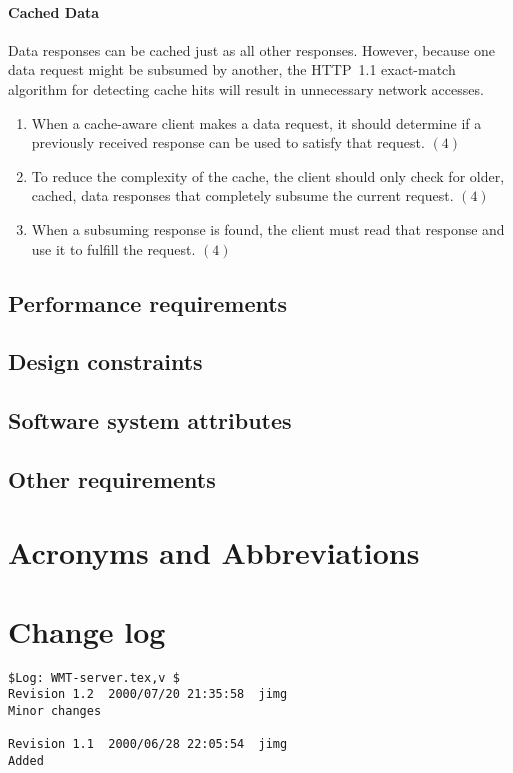 \documentclass{article}
\begin{document}
\paragraph{Cached Data}
Data responses can be cached just as all other responses. However, because
one data request might be subsumed by another, the HTTP~1.1 exact-match
algorithm for detecting cache hits will result in unnecessary network
accesses. 
\begin{enumerate}
\item When a cache-aware client makes a data request, it should determine if
  a previously received response can be used to satisfy that request. $(4)$
\item To reduce the complexity of the cache, the client should only check for
  older, cached, data responses that completely subsume the current request.
  $(4)$
\item When a subsuming response is found, the client must read that response
  and use it to fulfill the request. $(4)$
\end{enumerate}

\subsection{Performance requirements}
\subsection{Design constraints}
\subsection{Software system attributes}
\subsection{Other requirements}

\appendix

\section{Acronyms and Abbreviations}
\begin{acronym}

\end{acronym}

\section{Change log}

\begin{verbatim}
$Log: WMT-server.tex,v $
Revision 1.2  2000/07/20 21:35:58  jimg
Minor changes

Revision 1.1  2000/06/28 22:05:54  jimg
Added
\end{verbatim}


\raggedright


\end{document}
